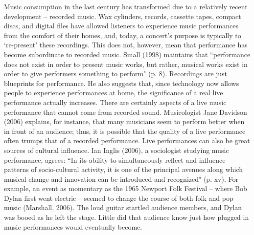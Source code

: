 Music consumption in the last century has transformed due to a relatively recent development -- recorded music. Wax cylinders, records, cassette tapes, compact discs, and digital files have allowed listeners to experience music performances from the comfort of their homes, and, today, a concert's purpose is typically to `re-present' these recordings. This does not, however, mean that performance has become subordinate to recorded music. Small (1998) maintains that ``performance does not exist in order to present music works, but rather, musical works exist in order to give performers something to perform" (p. 8). Recordings are just blueprints for performance. He also suggests that, since technology now allows people to experience performances at home, the significance of a real live performance actually increases. There are certainly aspects of a live music performance that cannot come from recorded sound. Musicologist Jane Davidson (2006) explains, for instance, that many musicians seem to perform better when in front of an audience; thus, it is possible that the quality of a live performance often trumps that of a recorded performance. Live performances can also be great sources of cultural influence. Ian Inglis (2006), a sociologist studying music performance, agrees: ``In its ability to simultaneously reflect and influence patterns of socio-cultural activity, it is one of the principal avenues along which musical change and innovation can be introduced and recognized" (p. xv). For example, an event as momentary as the 1965 Newport Folk Festival -- where Bob Dylan first went electric -- seemed to change the course of both folk and pop music (Marshall, 2006). The loud guitar startled audience members, and Dylan was booed as he left the stage. Little did that audience know just how plugged in music performances would eventually become.

